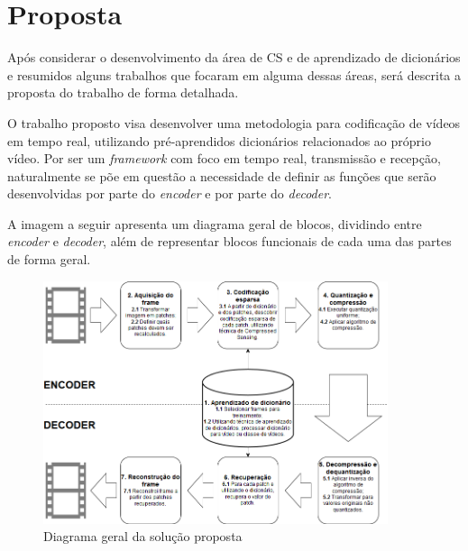 \documentclass[cic,tc]{iiufrgs}
\begin{document}
\chapter{Proposta}
Após considerar o desenvolvimento da área de CS e de aprendizado de dicionários e 
resumidos alguns trabalhos que focaram em alguma dessas áreas, será descrita a proposta 
do trabalho de forma detalhada.

O trabalho proposto visa desenvolver uma metodologia para codificação de vídeos em
tempo real, utilizando pré-aprendidos dicionários relacionados ao próprio vídeo.
Por ser um \textit{framework} com foco em tempo real, transmissão e recepção, 
naturalmente se põe em questão 
a necessidade de definir as funções que serão desenvolvidas por parte do \textit{encoder}
e por parte do \textit{decoder}.


A imagem a seguir apresenta um diagrama geral de blocos, dividindo entre \textit{encoder}
e \textit{decoder}, além de representar blocos funcionais de cada uma das partes de 
forma geral.
\begin{figure}[H]
    \caption{Diagrama geral da solução proposta}
    \begin{center}
        \includegraphics[width=0.9\textwidth]{img/DiagramaFinal.png}
    \end{center}
\end{figure}
\end{document}
